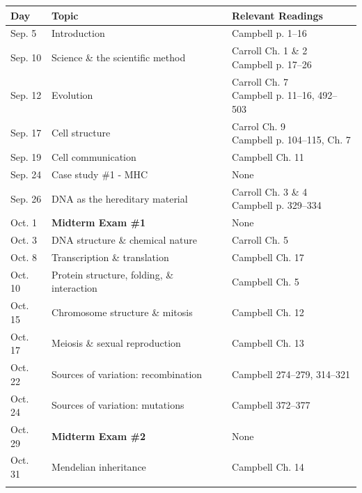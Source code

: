 \documentclass[hidelinks]{article}
\begin{document}
	\begin{table}[H]
		\centering
		\begin{tabular}{l p{6cm} p{6cm}}
			\toprule
			\textbf{Day} & \textbf{Topic} & \textbf{Relevant Readings}\\
			\midrule
			Sep. 5 & Introduction & Campbell p. 1--16\\
			\addlinespace
			Sep. 10 & Science \& the scientific method & \makecell[tl]{Carroll Ch. 1 \& 2\\ Campbell p. 17--26}\\
			\addlinespace
			Sep. 12 & Evolution & \makecell[tl]{Carroll Ch. 7\\ Campbell p. 11--16, 492--503}\\
			\addlinespace
			Sep. 17 & Cell structure & \makecell[tl]{Carrol Ch. 9\\ Campbell p. 104--115, Ch. 7}\\
			\addlinespace
			Sep. 19 & Cell communication & Campbell Ch. 11\\
			\addlinespace
			Sep. 24 & Case study \#1 - MHC & None\\
			\addlinespace
			Sep. 26 & DNA as the hereditary material & \makecell[tl]{Carroll Ch. 3 \& 4\\ Campbell p. 329--334}\\
			\addlinespace
			Oct. 1 & \textbf{Midterm Exam \#1} & None \\ 
			\addlinespace
			Oct. 3 & DNA structure \& chemical nature & Carroll Ch. 5\\
			\addlinespace
			Oct. 8 & Transcription \& translation & Campbell Ch. 17\\
			\addlinespace
			Oct. 10 & Protein structure, folding, \& interaction & Campbell Ch. 5\\
			\addlinespace
			Oct. 15 & Chromosome structure \& mitosis & Campbell Ch. 12\\
			\addlinespace
			Oct. 17 & Meiosis \& sexual reproduction & Campbell Ch. 13\\
			\addlinespace
			Oct. 22 & Sources of variation: recombination & Campbell 274--279, 314--321\\
			\addlinespace
			Oct. 24 & Sources of variation: mutations & Campbell 372--377\\
			\addlinespace
			Oct. 29 & \textbf{Midterm Exam \#2} & None\\ 
			\addlinespace
			Oct. 31 & Mendelian inheritance & Campbell Ch. 14\\
			\addlinespace

\end{tabular}
\end{table}
\end{document}

